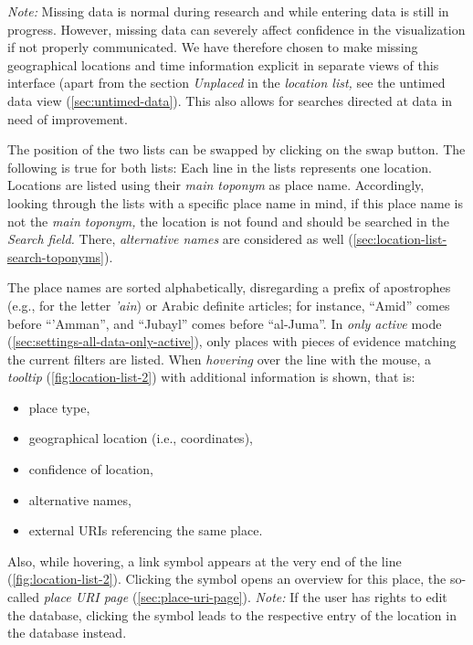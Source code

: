 \emph{Note:} Missing data is normal during research and while entering data is still in progress.
However, missing data can severely affect confidence in the visualization if not properly communicated.
We have therefore chosen to make missing geographical locations and time information explicit in separate views of this interface (apart from the section \emph{Unplaced} in the \emph{location list,} see the untimed data view (\cref{sec:untimed-data}).
This also allows for searches directed at data in need of improvement.

The position of the two lists can be swapped by clicking on the swap button.
The following is true for both lists:
Each line in the lists represents one location.
Locations are listed using their \emph{main toponym} as place name.
Accordingly, looking through the lists with a specific place name in mind, if this place name is not the \emph{main toponym,} the location is not found and should be searched in the \emph{Search field.}
There, \emph{alternative names} are considered as well (\cref{sec:location-list-search-toponyms}).

The place names are sorted alphabetically, disregarding a prefix of apostrophes (e.g., for the letter \emph{'ain}) or Arabic definite articles;
for instance, \enquote{Amid} comes before \enquote{'Amman}, and \enquote{Jubayl} comes before \enquote{al-Juma}.
In \emph{only active} mode (\cref{sec:settings-all-data-only-active}), only places with pieces of evidence matching the current filters are listed.
When \emph{hovering} over the line with the mouse, a \emph{tooltip} (\cref{fig:location-list-2}) with additional information is shown, that is:

\begin{itemize}
  \item place type,
  \item geographical location (i.e., coordinates),
  \item confidence of location,
  \item alternative names,
  \item external URIs referencing the same place.
\end{itemize}

Also, while hovering, a link symbol appears at the very end of the line (\cref{fig:location-list-2}).
Clicking the symbol opens an overview for this place, the so-called \emph{place URI page} (\cref{sec:place-uri-page}).
\emph{Note:} If the user has rights to edit the database, clicking the symbol leads to the respective entry of the location in the database instead.

